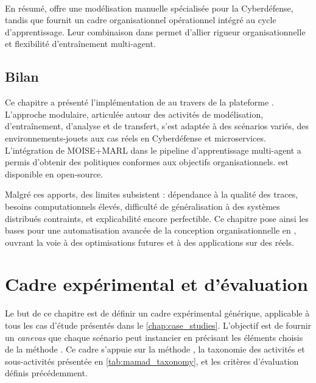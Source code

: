 \

En résumé,  offre une modélisation manuelle spécialisée pour la Cyberdéfense, tandis que  fournit un cadre organisationnel opérationnel intégré au cycle d'apprentissage. Leur combinaison dans  permet d'allier rigueur organisationnelle et flexibilité d'entraînement multi-agent.


\section{Bilan}

Ce chapitre a présenté l'implémentation de  au travers de la plateforme . L'approche modulaire, articulée autour des activités de modélisation, d'entraînement, d'analyse et de transfert, s'est adaptée à des scénarios variés, des environnements-jouets aux cas réels en Cyberdéfense et microservices.
L'intégration de MOISE+MARL dans le pipeline d'apprentissage multi-agent a permis d'obtenir des politiques conformes aux objectifs organisationnels.  est disponible en open-source\footnotemark[1].

Malgré ces apports, des limites subsistent : dépendance à la qualité des traces, besoins computationnels élevés, difficulté de généralisation à des systèmes distribués contraints, et explicabilité encore perfectible. Ce chapitre pose ainsi les bases pour une automatisation avancée de la conception organisationnelle en , ouvrant la voie à des optimisations futures et à des applications sur des  réels.


\clearpage
\thispagestyle{empty}
\null
\newpage


\chapter{Cadre expérimental et d'évaluation}
\label{chap:cadre_experimental}

Le but de ce chapitre est de définir un cadre expérimental générique, applicable à tous les cas d'étude présentés dans le \autoref{chap:case_studies}. L'objectif est de fournir un \textit{canevas} que chaque scénario peut instancier en précisant les éléments choisis de la méthode . Ce cadre s'appuie sur la méthode , la taxonomie des activités et sous-activités présentée en \autoref{tab:mamad_taxonomy}, et les critères d'évaluation définis précédemment.

